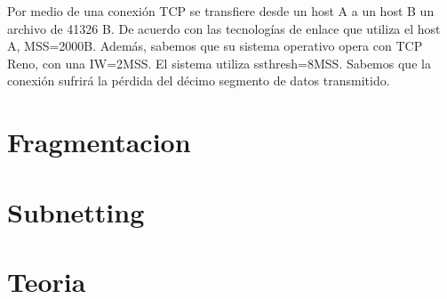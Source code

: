 \documentclass[titlepage,a4paper]{article}
\begin{document}
Por medio de una conexión TCP se transfiere desde un host A a un host B un archivo de 41326 B. De acuerdo con las tecnologías de enlace que utiliza el host A, MSS=2000B. Además, sabemos que su sistema operativo opera con TCP Reno, con una IW=2MSS. El sistema utiliza ssthresh=8MSS. Sabemos que la conexión sufrirá la pérdida del décimo segmento de datos transmitido.

\section{Fragmentacion}\label{sec:fragmentacion}



\section{Subnetting}\label{sec:subnetting}




\section{Teoria}\label{sec:teoria}


\end{document}
